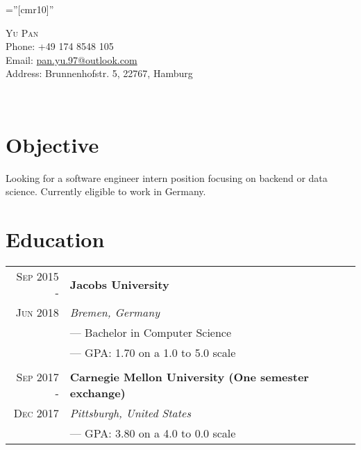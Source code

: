 \documentclass[a4paper,10pt]{article}
\begin{document}
	
	
	\pagestyle{empty} %
	
	\font\fb=''[cmr10]'' %
	
	\par{\centering
		{\huge{\textsc{Yu Pan}}}\\
		Phone: +49 174 8548 105  \\ Email: \href{mailto:pan.yu.97@outlook.com}{pan.yu.97@outlook.com}\\
		Address: Brunnenhofstr. 5, 22767, Hamburg \par}\\
	
	\section{Objective}
	Looking for a software engineer intern position focusing on backend or data science. Currently eligible to work in Germany.
	\section{Education}
	\begin{tabular}{r|l}
	    \textsc{Sep 2015 - } & \textbf{Jacobs University} \\\textsc{Jun 2018}&\emph{Bremen, Germany}
		\\& --- Bachelor in Computer Science
		\\& --- GPA: 1.70 on a 1.0 to 5.0 scale
		\\ \multicolumn{1}{c}{} \\
	    \textsc{Sep 2017 - } & \textbf{Carnegie Mellon University (One semester exchange)} \\\textsc{Dec 2017}&\emph{Pittsburgh, United States}
		\\& --- GPA: 3.80 on a 4.0 to 0.0 scale
	\end{tabular}
	
\end{document}
